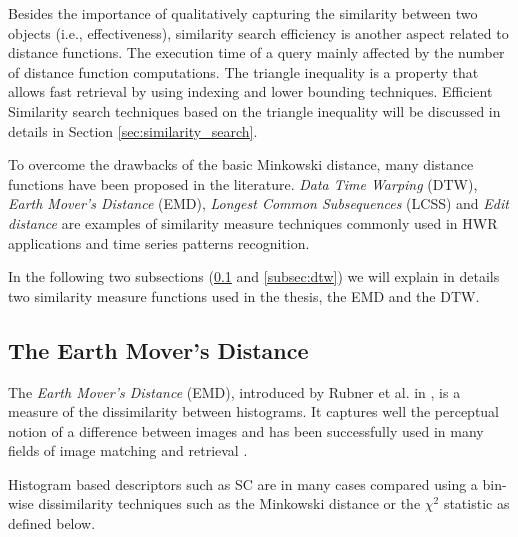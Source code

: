 \iftoggle{edit-mode}{\hspace{0pt}\marginpar{Efficiency and Triangularity}}{}
Besides the importance of qualitatively capturing the similarity between two objects (i.e., effectiveness), similarity search efficiency is another aspect related to distance functions. 
The execution time of a query mainly affected by the number of distance function computations. 
The triangle inequality is a property that allows fast retrieval by using indexing and lower bounding techniques. 
Efficient Similarity search techniques based on the triangle inequality will be discussed in details in Section \ref{sec:similarity_search}.

\iftoggle{edit-mode}{\hspace{0pt}\marginpar{Advanced distance measure techniques}}{}
To overcome the drawbacks of the basic Minkowski distance, many distance functions have been proposed in the literature. 
\emph{Data Time Warping} (DTW), \emph{Earth Mover's Distance} (EMD), \emph{Longest Common Subsequences} (LCSS) and \emph{Edit distance} are examples of similarity measure techniques commonly used in HWR applications and time series patterns recognition. 

\iftoggle{edit-mode}{\hspace{0pt}\marginpar{Next Subsections}}{}
In the following two subsections (\ref{subsec:emd} and \ref{subsec:dtw}) we will explain in details two similarity measure functions used in the thesis, the EMD and the DTW. 

\subsection{The Earth Mover's Distance}
\label{subsec:emd}

\iftoggle{edit-mode}{\hspace{0pt}\marginpar{Introduction to EMD}}{}
The \emph{Earth Mover's Distance} (EMD), introduced by Rubner et al. in \cite{rubner2000earth}, is a measure of the dissimilarity between histograms. 
It captures well the perceptual notion of a difference between images and has been successfully used in many fields of image matching and retrieval \cite{grauman2004fast, rubner2000earth}.

\iftoggle{edit-mode}{\hspace{0pt}\marginpar{Binwise based measures}}{}
Histogram based descriptors such as SC are in many cases compared using a bin-wise dissimilarity techniques such as the Minkowski distance or the $\chi^2$ statistic as defined below.
 
